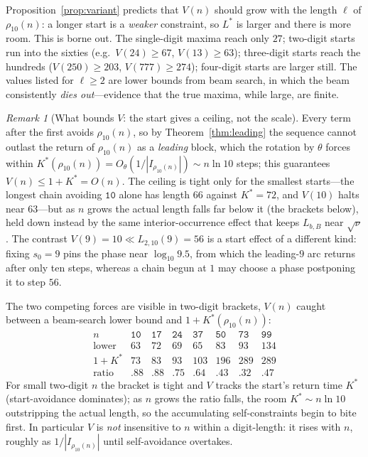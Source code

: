 \documentclass[11pt]{article}
\theoremstyle{plain}
\theoremstyle{definition}
\theoremstyle{remark}
\newtheorem{remark}{Remark}
\newcommand{\Lbb}{L_{b,B}}
\begin{document}
Proposition~\ref{prop:variant} predicts that $V(n)$ should grow with the length $\ell$ of $\rho_{10}(n)$: a longer start is a \emph{weaker} constraint, so $L^{*}$ is larger and there is more room. This is borne out. The single-digit maxima reach only $27$; two-digit starts run into the sixties (e.g.\ $V(24)\ge 67$, $V(13)\ge 63$); three-digit starts reach the hundreds ($V(250)\ge 203$, $V(777)\ge 274$); four-digit starts are larger still. The values listed for $\ell\ge2$ are lower bounds from beam search, in which the beam consistently \emph{dies out}---evidence that the true maxima, while large, are finite.

\begin{remark}[What bounds $V$: the start gives a ceiling, not the scale]
Every term after the first avoids $\rho_{10}(n)$, so by Theorem~\ref{thm:leading} the sequence cannot outlast the return of $\rho_{10}(n)$ as a \emph{leading} block, which the rotation by $\theta$ forces within $K^{*}(\rho_{10}(n))=O_\theta(1/|I_{\rho_{10}(n)}|)\sim n\ln10$ steps; this guarantees $V(n)\le1+K^{*}=O(n)$. The ceiling is tight only for the smallest starts---the longest chain avoiding $\texttt{10}$ alone has length $66$ against $K^{*}=72$, and $V(10)$ halts near $63$---but as $n$ grows the actual length falls far below it (the brackets below), held down instead by the same interior-occurrence effect that keeps $\Lbb$ near $\sqrt\nu$. The contrast $V(9)=10\ll L_{2,10}(9)=56$ is a start effect of a different kind: fixing $s_0=9$ pins the phase near $\log_{10}9.5$, from which the leading-$9$ arc returns after only ten steps, whereas a chain begun at $1$ may choose a phase postponing it to step $56$.
\end{remark}

The two competing forces are visible in two-digit brackets, $V(n)$ caught between a beam-search lower bound and $1+K^{*}(\rho_{10}(n))$:
\[
\begin{array}{c|ccccccc}
n & \texttt{10}&\texttt{17}&\texttt{24}&\texttt{37}&\texttt{50}&\texttt{73}&\texttt{99}\\\hline
\text{lower} & 63&72&69&65&83&93&134\\[1pt]
1+K^{*} & 73&83&93&103&196&289&289\\[1pt]
\text{ratio} & .88&.88&.75&.64&.43&.32&.47
\end{array}
\]
For small two-digit $n$ the bracket is tight and $V$ tracks the start's return time $K^{*}$ (start-avoidance dominates); as $n$ grows the ratio falls, the room $K^{*}\sim n\ln10$ outstripping the actual length, so the accumulating self-constraints begin to bite first. In particular $V$ is \emph{not} insensitive to $n$ within a digit-length: it rises with $n$, roughly as $1/|I_{\rho_{10}(n)}|$ until self-avoidance overtakes.
\end{document}
